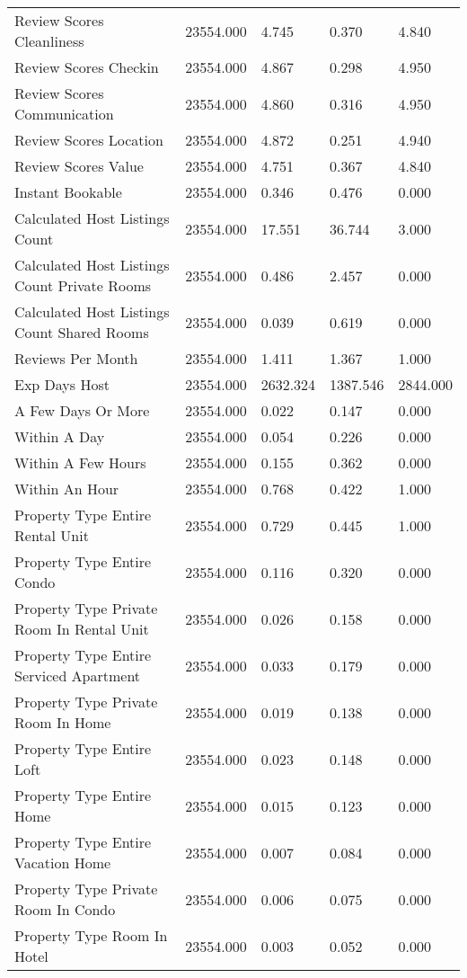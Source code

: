 \begin{tabular}{lllll}
Review Scores Cleanliness & 23554.000 & 4.745 & 0.370 & 4.840 \\
Review Scores Checkin & 23554.000 & 4.867 & 0.298 & 4.950 \\
Review Scores Communication & 23554.000 & 4.860 & 0.316 & 4.950 \\
Review Scores Location & 23554.000 & 4.872 & 0.251 & 4.940 \\
Review Scores Value & 23554.000 & 4.751 & 0.367 & 4.840 \\
Instant Bookable & 23554.000 & 0.346 & 0.476 & 0.000 \\
Calculated Host Listings Count & 23554.000 & 17.551 & 36.744 & 3.000 \\
Calculated Host Listings Count Private Rooms & 23554.000 & 0.486 & 2.457 & 0.000 \\
Calculated Host Listings Count Shared Rooms & 23554.000 & 0.039 & 0.619 & 0.000 \\
Reviews Per Month & 23554.000 & 1.411 & 1.367 & 1.000 \\
Exp Days Host & 23554.000 & 2632.324 & 1387.546 & 2844.000 \\
A Few Days Or More & 23554.000 & 0.022 & 0.147 & 0.000 \\
Within A Day & 23554.000 & 0.054 & 0.226 & 0.000 \\
Within A Few Hours & 23554.000 & 0.155 & 0.362 & 0.000 \\
Within An Hour & 23554.000 & 0.768 & 0.422 & 1.000 \\
Property Type Entire Rental Unit & 23554.000 & 0.729 & 0.445 & 1.000 \\
Property Type Entire Condo & 23554.000 & 0.116 & 0.320 & 0.000 \\
Property Type Private Room In Rental Unit & 23554.000 & 0.026 & 0.158 & 0.000 \\
Property Type Entire Serviced Apartment & 23554.000 & 0.033 & 0.179 & 0.000 \\
Property Type Private Room In Home & 23554.000 & 0.019 & 0.138 & 0.000 \\
Property Type Entire Loft & 23554.000 & 0.023 & 0.148 & 0.000 \\
Property Type Entire Home & 23554.000 & 0.015 & 0.123 & 0.000 \\
Property Type Entire Vacation Home & 23554.000 & 0.007 & 0.084 & 0.000 \\
Property Type Private Room In Condo & 23554.000 & 0.006 & 0.075 & 0.000 \\
Property Type Room In Hotel & 23554.000 & 0.003 & 0.052 & 0.000 \\

\end{tabular}
